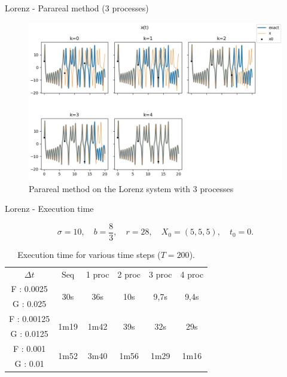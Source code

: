 	\begin{frame}{Lorenz - Parareal method (3 processes)}

	\begin{minipage}{\linewidth}
	\begin{figure}
		\centering       
		\includegraphics[width=0.7\linewidth]{"images/parareal/lorenz_3p.jpg"}
		\caption{Parareal method on the Lorenz system with 3 processes}
	\end{figure}
	\end{minipage}
	
	\end{frame}
	\begin{frame}{Lorenz - Execution time}

	$$\sigma=10, \quad b=\frac{8}{3}, \quad r=28, \quad X_0=(5,5,5), \quad t_0=0.$$
	\begin{table}[H]
		\centering
		\begin{tabular}{| c || c | c | c | c | c |}
			\hline
			\multirow{2}{1.5 cm}{$\Delta t$} & \multirow{2}{1.5 cm}{Seq} & \multirow{2}{1.5 cm}{1 proc} & \multirow{2}{1.5 cm}{2 proc} & \multirow{2}{1.5 cm}{3 proc} &\multirow{2}{1.5 cm}{4 proc} \\
			& & & & & \\
			\hline 
			F : 0.0025 & \multirow{2}{1.5 cm}{30s} & \multirow{2}{1.5 cm}{36s} & \multirow{2}{1.5 cm}{10s} & \multirow{2}{1.5 cm}{9,7s} & \multirow{2}{1.5 cm}{9,4s} \\
			G : 0.025 & & & & & \\
			\hline 
			F : 0.00125 & \multirow{2}{1.5 cm}{1m19} & \multirow{2}{1.5 cm}{1m42} & \multirow{2}{1.5 cm}{39s} & \multirow{2}{1.5 cm}{32s} & \multirow{2}{1.5 cm}{29s} \\
			G : 0.0125 & & & & & \\
			\hline 
			F : 0.001 & \multirow{2}{1.5 cm}{1m52} & \multirow{2}{1.5 cm}{3m40} & \multirow{2}{1.5 cm}{1m56} & \multirow{2}{1.5 cm}{1m29} & \multirow{2}{1.5 cm}{1m16} \\
			G : 0.01 & & & & & \\	 
			\hline
		\end{tabular}
		\caption{Execution time for various time steps ($T=200$).}
		\label{time}
	\end{table}

\end{frame}